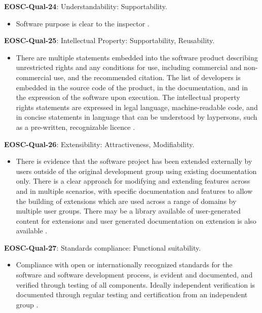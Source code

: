\textbf{EOSC-Qual-24}: Understandability: Supportability.

\begin{itemize}
    \item Software purpose is clear to the inspector \cite{boehm_quantitative_1976}.
\end{itemize}

\textbf{EOSC-Qual-25}: Intellectual Property: Supportability, Reusability.

\begin{itemize}
    \item There are multiple statements embedded into the software product describing unrestricted rights and any conditions for use, including commercial and non-commercial use, and the recommended citation. The list of developers is embedded in the source code of the product, in the documentation, and in the expression of the software upon execution. The intellectual property rights statements are expressed in legal language, machine-readable code, and in concise statements in language that can be understood by laypersons, such as a pre-written, recognizable licence \cite{shepherdson_cessda_2019}.
\end{itemize}

\textbf{EOSC-Qual-26}: Extensibility: Attractiveness, Modifiability.

\begin{itemize}
    \item There is evidence that the software project has been extended externally by users outside of the original development group using existing documentation only. There is a clear approach for modifying and extending features across and in multiple scenarios, with specific documentation and features to allow the building of extensions which are used across a range of domains by multiple user groups. There may be a library available of user-generated content for extensions and user generated documentation on extension is also available \cite{shepherdson_cessda_2019}.
\end{itemize}

\textbf{EOSC-Qual-27}: Standards compliance: Functional suitability.

\begin{itemize}
    \item Compliance with open or internationally recognized standards for the software and software development process, is evident and documented, and verified through testing of all components. Ideally independent verification is documented through regular testing and certification from an independent group \cite{shepherdson_cessda_2019}.
\end{itemize}

